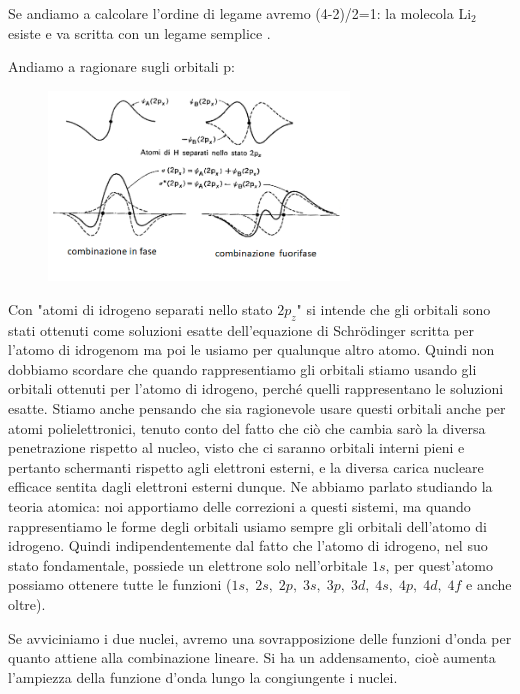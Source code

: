Se andiamo a calcolare l'ordine di legame avremo (4-2)/2=1: la molecola Li$_2$ esiste e va scritta con un legame semplice .

\vspace{0.2cm}Andiamo a ragionare sugli orbitali p:

\begin{figure}[htp]
    \centering
    \includegraphics[width=8cm]{immagini/orbitali_molecolari_pigreco.png}
\end{figure}

Con "atomi di idrogeno separati nello stato $2p_z$" si intende che gli orbitali sono stati ottenuti come soluzioni esatte dell'equazione di Schrödinger scritta per l'atomo di idrogenom ma poi le usiamo per qualunque altro atomo. Quindi non dobbiamo scordare che quando rappresentiamo gli orbitali stiamo usando gli orbitali ottenuti per l'atomo di idrogeno, perché quelli rappresentano le soluzioni esatte. Stiamo anche pensando che sia ragionevole usare questi orbitali anche per atomi polielettronici, tenuto conto del fatto che ciò che cambia sarò la diversa penetrazione rispetto al nucleo, visto che ci saranno orbitali interni pieni e pertanto schermanti rispetto agli elettroni esterni, e la diversa carica nucleare efficace sentita dagli elettroni esterni dunque. Ne abbiamo parlato studiando la teoria atomica: noi apportiamo delle correzioni a questi sistemi, ma quando rappresentiamo le forme degli orbitali usiamo sempre gli orbitali dell'atomo di idrogeno. Quindi indipendentemente dal fatto che l'atomo di idrogeno, nel suo stato fondamentale, possiede un elettrone solo nell'orbitale $1s$, per quest'atomo possiamo ottenere tutte le funzioni ($1s, \; 2s, \; 2p, \; 3s, \; 3p, \; 3d, \; 4s, \; 4p, \; 4d, \; 4f$ e anche oltre).

\vspace{0.2cm}Se avviciniamo i due nuclei, avremo una sovrapposizione delle funzioni d'onda per quanto attiene alla combinazione lineare. Si ha un addensamento, cioè aumenta l'ampiezza della funzione d'onda lungo la congiungente i nuclei.


